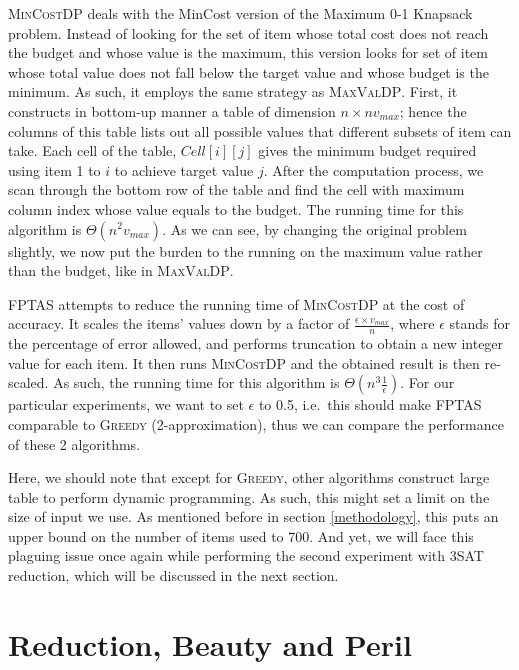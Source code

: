 \documentclass[12pt, oneside]{book}
\begin{document}
\textsc{MinCostDP} deals with the MinCost version of the Maximum 0-1
Knapsack problem. Instead of looking for the set of item whose total
cost does not reach the budget and whose value is the maximum, this
version looks for set of item whose total value does not fall below the
target value and whose budget is the minimum. As such, it employs the
same strategy as \textsc{MaxValDP}. First, it constructs in bottom-up
manner a table of dimension \(n \times nv_{max}\); hence the columns of
this table lists out all possible values that different subsets of item
can take. Each cell of the table, \(Cell[i][j]\) gives the minimum
budget required using item 1 to \(i\) to achieve target value \(j\).
After the computation process, we scan through the bottom row of the
table and find the cell with maximum column index whose value equals to
the budget. The running time for this algorithm is
\(\Theta(n^2v_{max})\). As we can see, by changing the original problem
slightly, we now put the burden to the running on the maximum value
rather than the budget, like in \textsc{MaxValDP}.

\textsc{FPTAS} attempts to reduce the running time of \textsc{MinCostDP}
at the cost of accuracy. It scales the items' values down by a factor of
\(\frac{\epsilon \times v_{max}}{n}\), where \(\epsilon\) stands for the
percentage of error allowed, and performs truncation to obtain a new
integer value for each item. It then runs \textsc{MinCostDP} and the
obtained result is then re-scaled. As such, the running time for this
algorithm is \(\Theta(n^3\frac{1}{\epsilon})\). For our particular
experiments, we want to set \(\epsilon\) to 0.5, i.e.~this should make
\textsc{FPTAS} comparable to \textsc{Greedy} (2-approximation), thus we
can compare the performance of these 2 algorithms.

Here, we should note that except for \textsc{Greedy}, other algorithms
construct large table to perform dynamic programming. As such, this
might set a limit on the size of input we use. As mentioned before in
section \ref{methodology}, this puts an upper bound on the number of
items used to 700. And yet, we will face this plaguing issue once again
while performing the second experiment with 3SAT reduction, which will
be discussed in the next section.

\chapter{Reduction, Beauty and Peril}\label{reduction}
\end{document}
